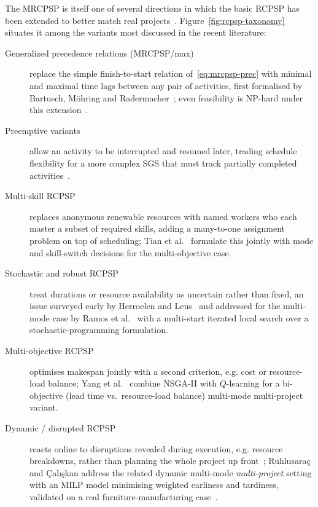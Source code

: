 The MRCPSP is itself one of several directions in which the basic RCPSP has been
extended to better match real projects~\cite{hartmann2010survey,mika2015mrcpsp}.
Figure~\ref{fig:rcpsp-taxonomy} situates it among the variants most discussed
in the recent literature:
\begin{description}
  \item[Generalized precedence relations (MRCPSP/max)] replace the simple
        finish-to-start relation of~\eqref{eq:mrcpsp-prec} with minimal and
        maximal time lags between any pair of activities, first formalised by
        Bartusch, M\"ohring and Radermacher~\cite{bartusch1988}; even feasibility
        is NP-hard under this extension~\cite{hartmann2010survey}.
  \item[Preemptive variants] allow an activity to be interrupted and resumed
        later, trading schedule flexibility for a more complex SGS that must
        track partially completed activities~\cite{vanpeteghem2010}.
  \item[Multi-skill RCPSP] replaces anonymous renewable resources with named
        workers who each master a subset of required skills, adding a
        many-to-one assignment problem on top of scheduling; Tian et
        al.~\cite{tian2022multiskill} formulate this jointly with mode and
        skill-switch decisions for the multi-objective case.
  \item[Stochastic and robust RCPSP] treat durations or resource availability as
        uncertain rather than fixed, an issue surveyed early by Herroelen and
        Leus~\cite{herroelen2005} and addressed for the multi-mode case by Ramos
        et al.~\cite{ramos2023stochastic} with a multi-start iterated local
        search over a stochastic-programming formulation.
  \item[Multi-objective RCPSP] optimises makespan jointly with a second
        criterion, e.g. cost or resource-load balance; Yang et
        al.~\cite{yang2024biobjective} combine NSGA-II with $Q$-learning for a
        bi-objective (lead time vs.\ resource-load balance) multi-mode
        multi-project variant.
  \item[Dynamic / disrupted RCPSP] reacts online to disruptions revealed during
        execution, e.g. resource breakdowns, rather than planning the whole
        project up front~\cite{cai2024rlgnn}; Ruhlusara\c{c} and \c{C}al{\i}\c{s}kan
        address the related dynamic multi-mode \emph{multi-project} setting with
        an MILP model minimising weighted earliness and tardiness, validated on
        a real furniture-manufacturing case~\cite{ruhlusarac2022dynamic}.
\end{description}

